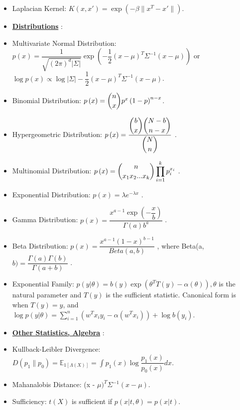 \documentclass{article}
\begin{document}
\begin{itemize}
\item Laplacian Kernel: $K\left(x, x'\right)  = \exp\left(- \beta \| x^{T} - x' \|\right)$.
\item \textbf{\underline{Distributions}} :
\item Multivariate Normal Distribution: $p\left(x\right)  = \dfrac{1}{\sqrt{\left(2 \pi\right)^{d} | \Sigma |}} \exp \left(- \dfrac{1}{2} \left(x - \mu\right)^{T} \Sigma^{-1} \left(x - \mu\right)\right)$ or $\log p\left(x\right) \propto \log | \Sigma | - \dfrac{1}{2} \left(x - \mu\right)^{T} \Sigma^{-1} \left(x - \mu\right)$.
\item Binomial Distribution: $p\left(x\right)  = \dbinom{n}{x} p^{x} \left(1 - p\right)^{n - x}$.
\item Hypergeometric Distribution: $p\left(x\right)  = \dfrac{\dbinom{b}{x} \dbinom{N-b}{n-x}}{\dbinom{N}{n}}$ .
\item Multinomial Distribution: $p\left(x\right)  = \dbinom{n}{x_{1} x_{2} ... x_{k}} \displaystyle\prod_{i=1}^{k} p_{i}^{x_{i}}$ .
\item Exponential Distribution: $p\left(x\right)  = \lambda e^{- \lambda x}$ .
\item Gamma Distribution: $p\left(x\right)  = \dfrac{x^{a - 1} \exp\left(- \dfrac{x}{b}\right)}{\Gamma\left(a\right) b^{a}}$ .
\item Beta Distribution: $p\left(x\right)  = \dfrac{x^{a - 1} \left(1 - x\right)^{b - 1}}{Beta\left(a, b\right)}$ , where Beta(a, $b) = \dfrac{\Gamma\left(a\right) \Gamma\left(b\right)}{\Gamma\left(a + b\right)}$ .
\item Exponential Family: $p\left(y | \theta\right)  = b\left(y\right) \exp\left(\theta^{T} T\left(y\right) - \alpha\left(\theta\right)\right), \theta$ is the natural parameter and $T\left(y\right) $ is the sufficient statistic. Canonical form is when $T\left(y\right)  = y $, and $\log p\left(y | \theta\right) = \displaystyle\sum_{i=1}^{n} \left(w^{T} x_{i} y_{i} - \alpha\left(w^{T} x_{i}\right)\right) + \log b\left(y_{i}\right)$.
\item \textbf{\underline{Other Statistics, Algebra}} :
\item Kullback-Leibler Divergence: $D\left(p_{1} \| p_{0}\right)  = \mathbb{E}_{1\left[\Lambda\left(X\right)\right]} = \displaystyle\int p_{1}\left(x\right) \log \dfrac{p_{1}\left(x\right)}{p_{0}\left(x\right)} dx$.
\item Mahanalobis Distance: (x - $\mu)^{T} \Sigma^{-1} \left(x - \mu\right)$.
\item Sufficiency: $t\left(X\right) $ is sufficient if $p\left(x | t, \theta\right)  = p\left(x | t\right) $.

\end{itemize}
\end{document}
